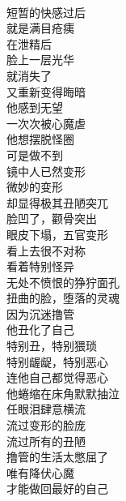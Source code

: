 \begin{poem}[撸管变形记]
    \begin{multicols}{3}
        \begin{center}~\\
            短暂的快感过后 \\ 就是满目疮痍 \\ 在泄精后 \\ 脸上一层光华 \\ 就消失了 \\ 又重新变得晦暗 \\ 他感到无望 \\ 一次次被心魔虐 \\ 他想摆脱怪圈 \\ 可是做不到 \\ 镜中人已然变形 \\ 微妙的变形 \\ 却显得极其丑陋突兀 \\ 脸凹了，颧骨突出 \\ 眼皮下塌，五官变形 \\ 看上去很不对称 \\ 看着特别怪异 \\ 无处不愤恨的狰狞面孔 \\ 扭曲的脸，堕落的灵魂 \\ 因为沉迷撸管 \\ 他丑化了自己 \\ 特别丑，特别猥琐 \\ 特别龌龊，特别恶心 \\ 连他自己都觉得恶心 \\ 他蜷缩在床角默默抽泣 \\ 任眼泪肆意横流 \\ 流过变形的脸庞 \\ 流过所有的丑陋 \\ 撸管的生活太憋屈了 \\ 唯有降伏心魔 \\ 才能做回最好的自己
        \end{center}
    \end{multicols}
\end{poem}

